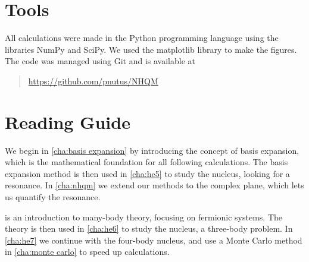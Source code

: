 
\section{Tools}

All calculations were made in the Python programming language 
using the libraries NumPy and SciPy. We used the matplotlib 
library to make the figures. The code was managed using Git 
and is available at
\begin{quote}
  \url{https://github.com/pnutus/NHQM}
\end{quote}

\section{Reading Guide}
We begin in \cref{cha:basis expansion} by introducing the concept of 
basis expansion, which is the mathematical foundation for all
following calculations. The basis expansion method is then used in 
\cref{cha:he5} to study the  nucleus, looking for a resonance.
In \cref{cha:nhqm} we extend our methods to the complex plane, which
lets us quantify the resonance.

 is an introduction to many-body theory, focusing 
on fermionic systems. The theory is then used in \cref{cha:he6} to study
the  nucleus, a three-body problem. In \cref{cha:he7} we continue 
with the four-body  nucleus, and use a Monte Carlo method in
\cref{cha:monte carlo} to speed up calculations.

